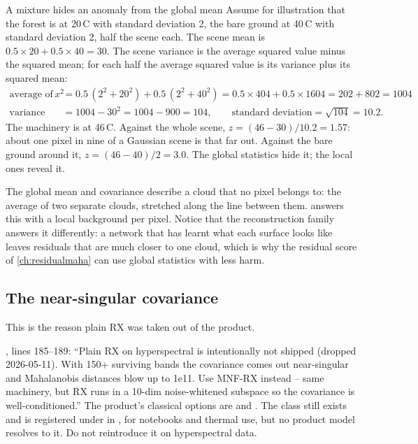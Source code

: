\begin{worked}[label={we:rx:mixture}]{A mixture hides an anomaly from the global mean}
Assume for illustration\tagA{} that the forest is at 20\,\textdegree C with standard deviation 2, the
bare ground at 40\,\textdegree C with standard deviation 2, half the scene each. The scene mean is
$0.5\times20 + 0.5\times40 = 30$. The scene variance is the average squared value minus the squared
mean; for each half the average squared value is its variance plus its squared mean:
\begin{align*}
\text{average of } x^2 &= 0.5\,(2^2 + 20^2) + 0.5\,(2^2 + 40^2) = 0.5\times404 + 0.5\times1604
  = 202 + 802 = 1004\\
\text{variance} &= 1004 - 30^2 = 1004 - 900 = 104,\qquad \text{standard deviation} = \sqrt{104} = 10.2 .
\end{align*}
The machinery is at 46\,\textdegree C. Against the whole scene, $z = (46 - 30)/10.2 = 1.57$: about
one pixel in nine of a Gaussian scene is that far out. Against the bare ground around it,
$z = (46 - 40)/2 = 3.0$. The global statistics hide it; the local ones reveal it.
\end{worked}

The global mean and covariance describe a cloud that no pixel belongs to: the average of two
separate clouds, stretched along the line between them.  answers this with a local
background per pixel. Notice that the reconstruction family answers it differently: a network that
has learnt what each surface looks like leaves residuals that are much closer to one cloud, which is
why the residual score of \cref{ch:residualmaha} can use global statistics with less harm.

\subsection{The near-singular covariance}\label{sec:rx:singular}

This is the reason plain RX was taken out of the product.

\begin{sourcenote}
, lines 185--189:
``Plain RX on hyperspectral is intentionally not shipped (dropped 2026-05-11). With 150+ surviving
bands the covariance comes out near-singular and Mahalanobis distances blow up to 1e11. Use MNF-RX
instead -- same machinery, but RX runs in a 10-dim noise-whitened subspace so the covariance is
well-conditioned.'' The product's classical options are  and . The
class  still exists and is registered under  in
, for notebooks and thermal use, but no
product model resolves to it. Do not reintroduce it on hyperspectral data.
\end{sourcenote}

